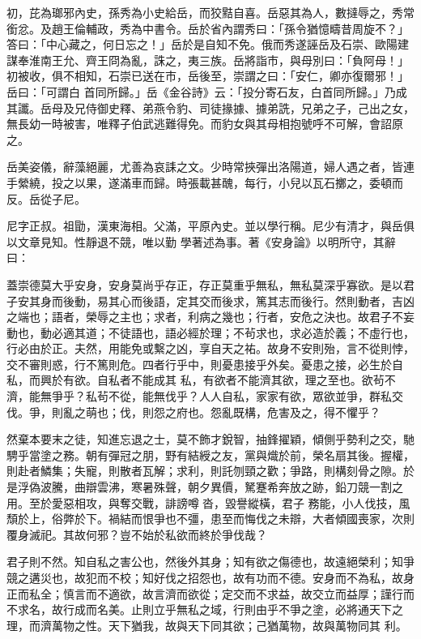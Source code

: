 \begin{pinyinscope}
 初，芘為瑯邪內史，孫秀為小史給岳，而狡黠自喜。岳惡其為人，數撻辱之，秀常銜忿。及趙王倫輔政，秀為中書令。岳於省內謂秀曰：「孫令猶憶疇昔周旋不？」答曰：「中心藏之，何日忘之！」岳於是自知不免。俄而秀遂誣岳及石崇、歐陽建謀奉淮南王允、齊王冏為亂，誅之，夷三族。岳將詣市，與母別曰：「負阿母！」初被收，俱不相知，石崇已送在市，岳後至，崇謂之曰：「安仁，卿亦復爾邪！」岳曰：「可謂白
 首同所歸。」岳《金谷詩》云：「投分寄石友，白首同所歸。」乃成其讖。岳母及兄侍御史釋、弟燕令豹、司徒掾據、據弟詵，兄弟之子，己出之女，無長幼一時被害，唯釋子伯武逃難得免。而豹女與其母相抱號呼不可解，會詔原之。



 岳美姿儀，辭藻絕麗，尤善為哀誄之文。少時常挾彈出洛陽道，婦人遇之者，皆連手縈繞，投之以果，遂滿車而歸。時張載甚醜，每行，小兒以瓦石擲之，委頓而反。岳從子尼。



 尼字正叔。祖勖，漢東海相。父滿，平原內史。並以學行稱。尼少有清才，與岳俱以文章見知。性靜退不競，唯以勤
 學著述為事。著《安身論》以明所守，其辭曰：



 蓋崇德莫大乎安身，安身莫尚乎存正，存正莫重乎無私，無私莫深乎寡欲。是以君子安其身而後動，易其心而後語，定其交而後求，篤其志而後行。然則動者，吉凶之端也；語者，榮辱之主也；求者，利病之幾也；行者，安危之決也。故君子不妄動也，動必適其道；不徒語也，語必經於理；不茍求也，求必造於義；不虛行也，行必由於正。夫然，用能免或繫之凶，享自天之祐。故身不安則殆，言不從則悖，交不審則惑，行不篤則危。四者行乎中，則憂患接乎外矣。憂患之接，必生於自私，而興於有欲。自私者不能成其
 私，有欲者不能濟其欲，理之至也。欲茍不濟，能無爭乎？私茍不從，能無伐乎？人人自私，家家有欲，眾欲並爭，群私交伐。爭，則亂之萌也；伐，則怨之府也。怨亂既構，危害及之，得不懼乎？



 然棄本要末之徒，知進忘退之士，莫不飾才銳智，抽鋒擢穎，傾側乎勢利之交，馳騁乎當塗之務。朝有彈冠之朋，野有結綬之友，黨與熾於前，榮名扇其後。握權，則赴者鱗集；失寵，則散者瓦解；求利，則託刎頸之歡；爭路，則構刻骨之隙。於是浮偽波騰，曲辯雲沸，寒暑殊聲，朝夕異價，駑蹇希奔放之跡，鉛刀競一割之用。至於愛惡相攻，與奪交戰，誹謗噂沓，毀譽縱橫，君子
 務能，小人伐技，風頹於上，俗弊於下。禍結而恨爭也不彊，患至而悔伐之未辯，大者傾國喪家，次則覆身滅祀。其故何邪？豈不始於私欲而終於爭伐哉？



 君子則不然。知自私之害公也，然後外其身；知有欲之傷德也，故遠絕榮利；知爭競之遘災也，故犯而不校；知好伐之招怨也，故有功而不德。安身而不為私，故身正而私全；慎言而不適欲，故言濟而欲從；定交而不求益，故交立而益厚；謹行而不求名，故行成而名美。止則立乎無私之域，行則由乎不爭之塗，必將通天下之理，而濟萬物之性。天下猶我，故與天下同其欲；己猶萬物，故與萬物同其
 利。




\end{pinyinscope}
